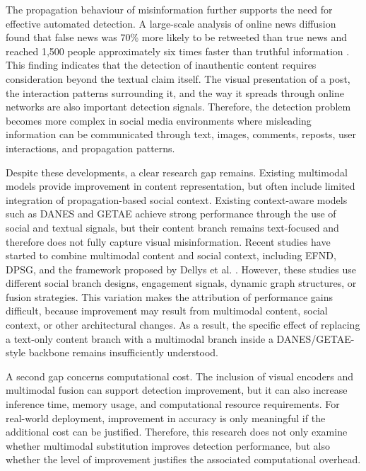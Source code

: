 The propagation behaviour of misinformation further supports the need for effective automated detection. A large-scale analysis of online news diffusion found that false news was 70\% more likely to be retweeted than true news and reached 1,500 people approximately six times faster than truthful information \citep{Vosoughi2018}. This finding indicates that the detection of inauthentic content requires consideration beyond the textual claim itself. The visual presentation of a post, the interaction patterns surrounding it, and the way it spreads through online networks are also important detection signals. Therefore, the detection problem becomes more complex in social media environments where misleading information can be communicated through text, images, comments, reposts, user interactions, and propagation patterns.

Despite these developments, a clear research gap remains. Existing multimodal models provide improvement in content representation, but often include limited integration of propagation-based social context. Existing context-aware models such as DANES and GETAE achieve strong performance through the use of social and textual signals, but their content branch remains text-focused and therefore does not fully capture visual misinformation. Recent studies have started to combine multimodal content and social context, including EFND, DPSG, and the framework proposed by Dellys et al. \citep{Nadeem2023,jing2025,Dellys2025}. However, these studies use different social branch designs, engagement signals, dynamic graph structures, or fusion strategies. This variation makes the attribution of performance gains difficult, because improvement may result from multimodal content, social context, or other architectural changes. As a result, the specific effect of replacing a text-only content branch with a multimodal branch inside a DANES/GETAE-style backbone remains insufficiently understood.

A second gap concerns computational cost. The inclusion of visual encoders and multimodal fusion can support detection improvement, but it can also increase inference time, memory usage, and computational resource requirements. For real-world deployment, improvement in accuracy is only meaningful if the additional cost can be justified. Therefore, this research does not only examine whether multimodal substitution improves detection performance, but also whether the level of improvement justifies the associated computational overhead.

